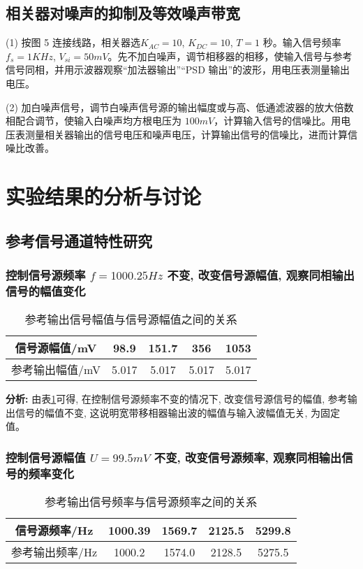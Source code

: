 \documentclass{whureport}
\begin{document}
\begin{multicols}{2}
\subsection{相关器对噪声的抑制及等效噪声带宽}
(1) 按图 5 连接线路，相关器选$K_{AC} = 10$, $K_{DC} = 10$, $T = 1$ 秒。输入信号频率$f_s = 1KHz$, $V_{si} = 50mV$。先不加白噪声，调节相移器的相移，使输入信号与参考信号同相，并用示波器观察“加法器输出”“PSD 输出”的波形，用电压表测量输出电压。

(2) 加白噪声信号，调节白噪声信号源的输出幅度或与高、低通滤波器的放大倍数相配合调节，使输入白噪声均方根电压为 $100mV$，计算输入信号的信噪比。用电压表测量相关器输出的信号电压和噪声电压，计算输出信号的信噪比，进而计算信噪比改善。


\section{实验结果的分析与讨论}

\subsection{参考信号通道特性研究}

\subsubsection{控制信号源频率 $f = 1000.25Hz$ 不变, 改变信号源幅值, 观察同相输出信号的幅值变化}

\begin{table}[H]
	\centering
	\caption{参考输出信号幅值与信号源幅值之间的关系}
	\begin{tabular}{ |c|c|c|c|c| } 
	 \hline
	 信号源幅值/mV & 98.9 & 151.7 & 356 & 1053 \\ 
	 \hline
	 参考输出幅值/mV & 5.017 & 5.017 & 5.017 & 5.017 \\ 
	 \hline
	\end{tabular}
	\label{tab:1}
\end{table}

\textbf{分析:} 由表\ref{tab:1}可得, 在控制信号源频率不变的情况下, 改变信号源信号的幅值, 参考输出信号的幅值不变, 这说明宽带移相器输出波的幅值与输入波幅值无关, 为固定值。

\subsubsection{控制信号源幅值 $U = 99.5mV$ 不变, 改变信号源频率, 观察同相输出信号的频率变化}

\begin{table}[H]
\centering
\caption{参考输出信号频率与信号源频率之间的关系}
\begin{tabular}{ |c|c|c|c|c| } 
 \hline
 信号源频率/Hz & 1000.39 & 1569.7 & 2125.5 & 5299.8 \\ 
 \hline
 参考输出频率/Hz & 1000.2 & 1574.0 & 2128.5 & 5275.5 \\ 
 \hline
\end{tabular}
\label{tab:2}
\end{table}


\end{multicols}
\end{document}
